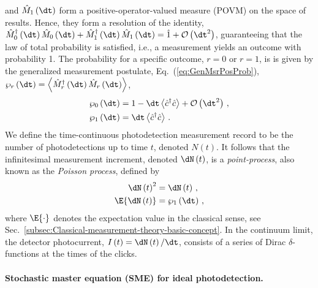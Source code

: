and $\hat{M}_{1}\left(\dt\right)$ form a positive-operator-valued
measure (POVM) on the space of results. Hence, they form a resolution
of the identity, $\hat{M}_{0}^{\dagger}\left(\dt\right)\hat{M}_{0}\left(\dt\right)+\hat{M}_{1}^{\dagger}\left(\dt\right)\hat{M}_{1}\left(\dt\right)=\hat{1}+\mathcal{O}\left(\dt^{2}\right)$,
guaranteeing that the law of total probability is satisfied, i.e.,
a measurement yields an outcome with probability 1. The probability
for a specific outcome, $r=0$ or $r=1$, is is given by the generalized
measurement postulate, Eq.~(\ref{eq:GenMsrPosProb}), $\wp_{r}\left(\dt\right)=\left\langle \hat{M}_{r}^{\dagger}\left(\dt\right)\hat{M}_{r}\left(\dt\right)\right\rangle $,
\begin{align}
\wp_{0}\left(\dt\right) & =1-\dt\left\langle \hat{c}^{\dagger}\hat{c}\right\rangle +\mathcal{O}\left(\dt^{2}\right)\,,\label{eq:PhotonP0}\\
\wp_{1}\left(\dt\right) & =\dt\left\langle \hat{c}^{\dagger}\hat{c}\right\rangle \,.\label{eq:PhotonP1}
\end{align}
We define the time-continuous photodetection measurement record to
be the number of photodetections up to time $t$, denoted $N\left(t\right)$.
It follows that the infinitesimal measurement increment, denoted $\dN\left(t\right)$,
is a \emph{point-process}, also known as the \emph{Poisson process},
defined by 
\begin{align}
\dN\left(t\right)^{2} & =\dN\left(t\right)\,,\label{eq:Photon-dN-2}\\
\E{\dN\left(t\right)} & =\wp_{1}\left(\dt\right)\,,\label{eq:Photon-dN-E}
\end{align}
where $\E{\cdot}$ denotes the expectation value in the classical
sense, see Sec.~\ref{subsec:Classical-measurement-theory-basic-concept}.
In the continuum limit, the detector photocurrent, $I\left(t\right)=\dN\left(t\right)/\dt$,
consists of a series of Dirac $\delta$-functions at the times of
the clicks. 

\paragraph{Stochastic master equation (SME) for ideal photodetection. }


